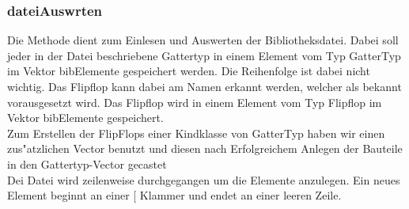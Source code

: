 \documentclass[a4paper,10pt,twoside]{report}
\begin{document}
\subsubsection{dateiAuswrten}
Die Methode dient zum Einlesen und Auswerten der Bibliotheksdatei.
Dabei soll jeder in der Datei beschriebene Gattertyp in einem Element vom Typ
GatterTyp im Vektor bibElemente gespeichert werden. Die Reihenfolge ist
dabei nicht wichtig. Das Flipflop kann dabei am Namen erkannt werden, welcher als bekannt vorausgesetzt wird.
Das Flipflop wird in einem Element vom Typ Flipflop im Vektor bibElemente gespeichert.
\\
Zum Erstellen der FlipFlops einer Kindklasse von GatterTyp haben wir einen zus"atzlichen Vector benutzt und diesen nach Erfolgreichem Anlegen der Bauteile in den Gattertyp-Vector gecastet
\\
Dei Datei wird zeilenweise durchgegangen um die Elemente anzulegen. Ein neues Element beginnt an einer [ Klammer und endet an einer leeren Zeile.
\end{document}
